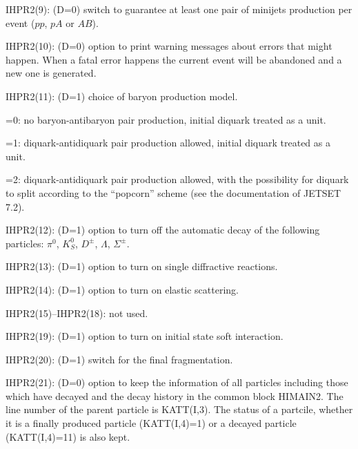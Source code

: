 \begin{description}
\item{}IHPR2(9): (D=0) switch to guarantee at least one pair of minijets
                production per event ($pp$, $pA$ or $AB$).
\item{}IHPR2(10): (D=0) option to print warning messages about errors that 
                might happen. When a fatal error happens the current event 
                will be abandoned and a new one is generated.
\item{}IHPR2(11): (D=1) choice of baryon production model.
        \vspace{-12.0pt}
        \begin{description}
        \itemsep=-4.0pt
                \item{}=0: no baryon-antibaryon pair production, initial 
                        diquark treated as a unit.
                \item{}=1: diquark-antidiquark pair production allowed, 
                        initial diquark treated as a unit.
                \item{}=2: diquark-antidiquark pair production allowed, 
                        with the possibility for diquark to split 
                        according to the ``popcorn'' scheme (see the 
                        documentation of JETSET 7.2).
        \end{description}
        \vspace{-4.0pt}
\item{}IHPR2(12): (D=1) option to turn off the automatic decay of the
                 following particles: 
                $\pi^0$, $K^0_S$, $D^{\pm}$, $\Lambda$, $\Sigma^{\pm}$.
\item{}IHPR2(13): (D=1) option to turn on single diffractive reactions.
\item{}IHPR2(14): (D=1) option to turn on elastic scattering.
\item{}IHPR2(15)--IHPR2(18): not used.
\item{}IHPR2(19): (D=1) option to turn on initial state soft interaction.
\item{}IHPR2(20): (D=1) switch for the final fragmentation.
\item{}IHPR2(21): (D=0) option to keep the information of all particles 
                  including those which have decayed and the decay history
                  in the common block HIMAIN2. The line number of the parent 
                  particle is KATT(I,3). The status of a partcile, 
                  whether it is a finally produced particle (KATT(I,4)=1) 
                  or a decayed particle (KATT(I,4)=11) is also kept.

\end{description}
